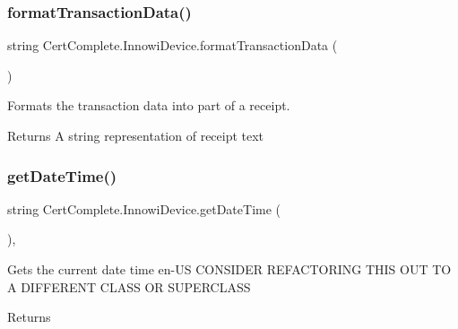 \subsubsection{\texorpdfstring{format\+Transaction\+Data()}{formatTransactionData()}}
{\footnotesize\ttfamily string Cert\+Complete.\+Innowi\+Device.\+format\+Transaction\+Data (\begin{DoxyParamCaption}{ }\end{DoxyParamCaption})\hspace{0.3cm}{\ttfamily [inline]}}



Formats the transaction data into part of a receipt. 

\begin{DoxyReturn}{Returns}
A string representation of receipt text
\end{DoxyReturn}
\mbox{\label{class_cert_complete_1_1_innowi_device_af454a3482e7fa81495f3ea39a1e490ce}} 
\subsubsection{\texorpdfstring{get\+Date\+Time()}{getDateTime()}}
{\footnotesize\ttfamily string Cert\+Complete.\+Innowi\+Device.\+get\+Date\+Time (\begin{DoxyParamCaption}{ }\end{DoxyParamCaption})\hspace{0.3cm}{\ttfamily [inline]}, {\ttfamily [private]}}



Gets the current date time en-\/\+US C\+O\+N\+S\+I\+D\+ER R\+E\+F\+A\+C\+T\+O\+R\+I\+NG T\+H\+IS O\+UT TO A D\+I\+F\+F\+E\+R\+E\+NT C\+L\+A\+SS OR S\+U\+P\+E\+R\+C\+L\+A\+SS 

\begin{DoxyReturn}{Returns}

\end{DoxyReturn}
\mbox{\label{class_cert_complete_1_1_innowi_device_adf36712e4b4f7090c69a4f5b55ff1de9}} 
